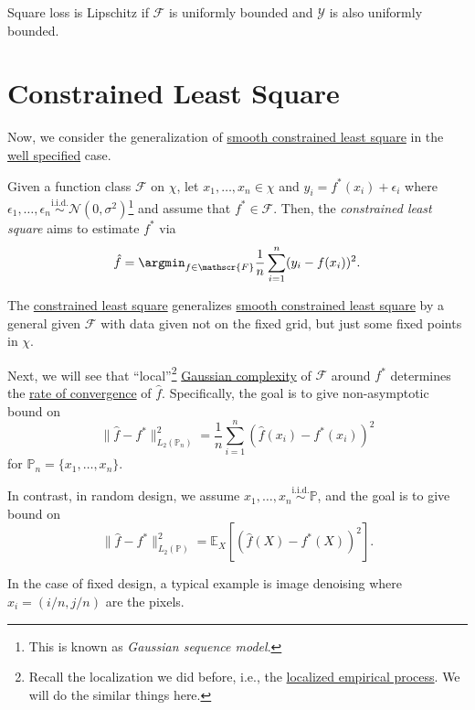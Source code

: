 \begin{eg}
	Square loss is Lipschitz if \(\mathscr{F} \) is uniformly bounded and \(\mathscr{Y} \) is also uniformly bounded.
\end{eg}

\section{Constrained Least Square}
Now, we consider the generalization of \hyperref[prb:smooth-LS]{smooth constrained least square} in the \hyperref[def:well-specified]{well specified} case.

\begin{problem}\label{prb:constrained-LS}
Given a function class \(\mathscr{F} \) on \(\chi \), let \(x_1, \dots , x_n \in \chi \) and \(y_i = f^{\ast} (x_i) + \epsilon _i\) where \(\epsilon _1, \dots , \epsilon _n \overset{\text{i.i.d.} }{\sim } \mathcal{N} (0, \sigma ^2) \)\footnote{This is known as \emph{Gaussian sequence model}.} and assume that \(f^{\ast} \in \mathscr{F} \). Then, the \emph{constrained least square} aims to estimate \(f^{\ast} \) via
\[
	\hat{f} = \argmin_{f\in\mathscr{F} } \frac{1}{n} \sum_{i=1}^{n} (y_i - f(x_i))^2.
\]
\end{problem}

\begin{note}
	The \hyperref[prb:constrained-LS]{constrained least square} generalizes \hyperref[prb:smooth-LS]{smooth constrained least square} by a general given \(\mathscr{F} \) with data given not on the fixed grid, but just some fixed points in \(\chi \).
\end{note}

Next, we will see that ``local''\footnote{Recall the localization we did before, i.e., the \hyperref[def:localized-EP]{localized empirical process}. We will do the similar things here.} \hyperref[def:Gaussian-width]{Gaussian complexity} of \(\mathscr{F} \) around \(f^{\ast} \) determines the \hyperref[def:rate-of-convergence]{rate of convergence} of \(\hat{f} \). Specifically, the goal is to give non-asymptotic bound on
\[
	\lVert \hat{f} - f^{\ast} \rVert ^2 _{L_2(\mathbb{P} _n)}
	= \frac{1}{n} \sum_{i=1}^{n} \left( \hat{f} (x_i) - f^{\ast} (x_i) \right) ^2
\]
for \(\mathbb{P} _n = \{ x_1, \dots , x_n \} \).

\begin{note}
	In contrast, in random design, we assume \(x_1, \dots , x_n \overset{\text{i.i.d.} }{\sim } \mathbb{P} \), and the goal is to give bound on
	\[
		\lVert \hat{f} - f^{\ast} \rVert ^2_{L_2(\mathbb{P} )}
		= \mathbb{E}_{X}\left[(\hat{f} (X) - f^{\ast} (X))^2 \right] .
	\]
\end{note}

\begin{eg}
	In the case of fixed design, a typical example is image denoising where \(x_i = (i / n, j / n)\) are the pixels.
\end{eg}
